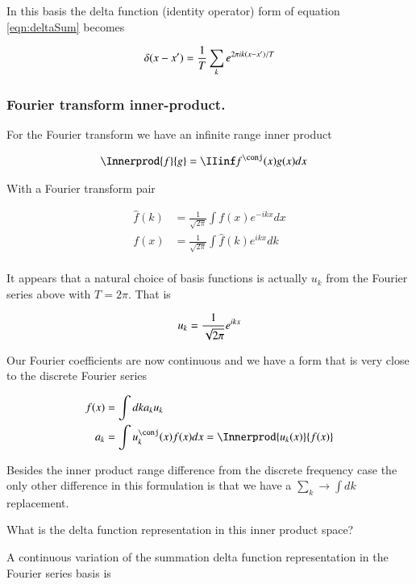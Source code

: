 \documentclass{article}
\begin{document}
In this basis the 
delta function (identity operator) form of equation \ref{eqn:deltaSum}
becomes

\begin{align*}
\delta(x- x') = \frac{1}{{T}} \sum_k e^{ 2 \pi i k (x-x') / T}
\end{align*}

\subsubsection{Fourier transform inner-product. }

For the Fourier transform we have an infinite range inner product

\begin{align*}
\Innerprod{f}{g} &= \IIinf f^\conj(x) g(x) dx
\end{align*}

With a Fourier transform pair 

\begin{align*}
\hat{f}(k) &= \frac{1}{\sqrt{2\pi}} \int f(x) e^{-i k x} dx \\
{f}(x) &= \frac{1}{\sqrt{2\pi}} \int \hat{f}(k) e^{i k x } dk \\
\end{align*}

It appears that a natural choice of basis functions is actually $u_k$ from the
Fourier series above with $T=2\pi$.  That is

\begin{align*}
u_k = \frac{1}{\sqrt{2\pi}} e^{i k x}
\end{align*}

Our Fourier coefficients are now continuous and we have a form that
is very close to the discrete Fourier series

\begin{align*}
f(x) 
&= \int dk a_k u_k \\
a_k &= \int u_k^\conj(x) f(x) dx = \Innerprod{u_k(x)}{f(x)} \\
\end{align*}

Besides the inner product range difference from the discrete frequency case
the only other difference in this formulation is that we have a 
$\sum_k \rightarrow \int dk$ replacement.

What is the delta function representation in this inner product space?

A continuous variation of the summation delta function representation
in the Fourier series basis is
\end{document}
